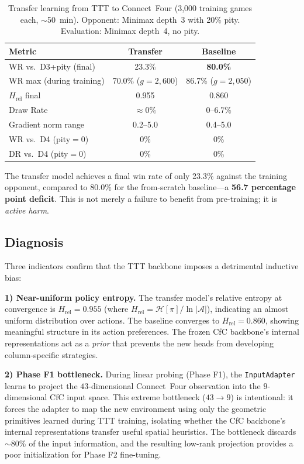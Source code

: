 \documentclass[conference]{IEEEtran}
\newcommand{\Hrel}{H_{\text{rel}}}
\begin{document}
\begin{table}[ht]
\centering
\caption{Transfer learning from TTT to Connect~Four (3{,}000 training games each, $\sim$50~min). Opponent: Minimax depth~3 with 20\% pity. Evaluation: Minimax depth~4, no pity.}
\label{tab:transfer}
\begin{tabular}{@{}lcc@{}}
\toprule
\textbf{Metric} & \textbf{Transfer} & \textbf{Baseline} \\
\midrule
WR vs.\ D3+pity (final) & 23.3\% & \textbf{80.0\%} \\
WR max (during training) & 70.0\% ($g=2{,}600$) & 86.7\% ($g=2{,}050$) \\
$\Hrel$ final & 0.955 & 0.860 \\
Draw Rate & $\approx 0\%$ & 0--6.7\% \\
Gradient norm range & 0.2--5.0 & 0.4--5.0 \\
\midrule
WR vs.\ D4 (pity$=0$) & 0\% & 0\% \\
DR vs.\ D4 (pity$=0$) & 0\% & 0\% \\
\bottomrule
\end{tabular}
\end{table}

The transfer model achieves a final win rate of only 23.3\% against the training opponent, compared to 80.0\% for the from-scratch baseline---a \textbf{56.7 percentage point deficit}. This is not merely a failure to benefit from pre-training; it is \emph{active harm}.

\subsection{Diagnosis}
\label{ssec:transfer_diag}

Three indicators confirm that the TTT backbone imposes a detrimental inductive bias:

\textbf{1) Near-uniform policy entropy.} The transfer model's relative entropy at convergence is $\Hrel = 0.955$ (where $\Hrel = \mathcal{H}[\pi] / \ln |\mathcal{A}|$), indicating an almost uniform distribution over actions. The baseline converges to $\Hrel = 0.860$, showing meaningful structure in its action preferences. The frozen CfC backbone's internal representations act as a \emph{prior} that prevents the new heads from developing column-specific strategies.

\textbf{2) Phase F1 bottleneck.} During linear probing (Phase F1), the \texttt{InputAdapter} learns to project the $43$-dimensional Connect~Four observation into the $9$-dimensional CfC input space. This extreme bottleneck ($43 \to 9$) is intentional: it forces the adapter to map the new environment using only the geometric primitives learned during TTT training, isolating whether the CfC backbone's internal representations transfer useful spatial heuristics. The bottleneck discards $\sim$80\% of the input information, and the resulting low-rank projection provides a poor initialization for Phase F2 fine-tuning.
\end{document}
